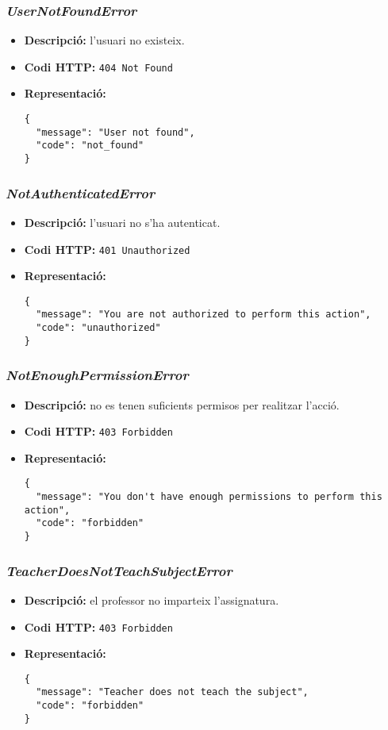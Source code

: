\subsubsection{\emph{UserNotFoundError}}
\begin{itemize}
	\item \textbf{Descripció:} l'usuari no existeix.

	\item \textbf{Codi \ac{HTTP}:} \texttt{404 Not Found}
	\item \textbf{Representació:}
\begin{verbatim}
{
  "message": "User not found",
  "code": "not_found"
}
\end{verbatim}
\end{itemize}

\subsubsection{\emph{NotAuthenticatedError}}
\begin{itemize}
	\item \textbf{Descripció:} l'usuari no s'ha autenticat.
	\item \textbf{Codi \ac{HTTP}:} \texttt{401 Unauthorized}
	\item \textbf{Representació:}
\begin{verbatim}
{
  "message": "You are not authorized to perform this action",
  "code": "unauthorized"
}
\end{verbatim}
\end{itemize}

\subsubsection{\emph{NotEnoughPermissionError}}
\begin{itemize}
	\item \textbf{Descripció:} no es tenen suficients permisos per realitzar l'acció.
	\item \textbf{Codi \ac{HTTP}:} \texttt{403 Forbidden}
	\item \textbf{Representació:}
\begin{verbatim}
{
  "message": "You don't have enough permissions to perform this action",
  "code": "forbidden"
}
\end{verbatim}
\end{itemize}

\subsubsection{\emph{TeacherDoesNotTeachSubjectError}}
\begin{itemize}
	\item \textbf{Descripció:} el professor no imparteix l'assignatura.
	\item \textbf{Codi \ac{HTTP}:} \texttt{403 Forbidden}
	\item \textbf{Representació:}
\begin{verbatim}
{
  "message": "Teacher does not teach the subject",
  "code": "forbidden"
}
\end{verbatim}
\end{itemize}
